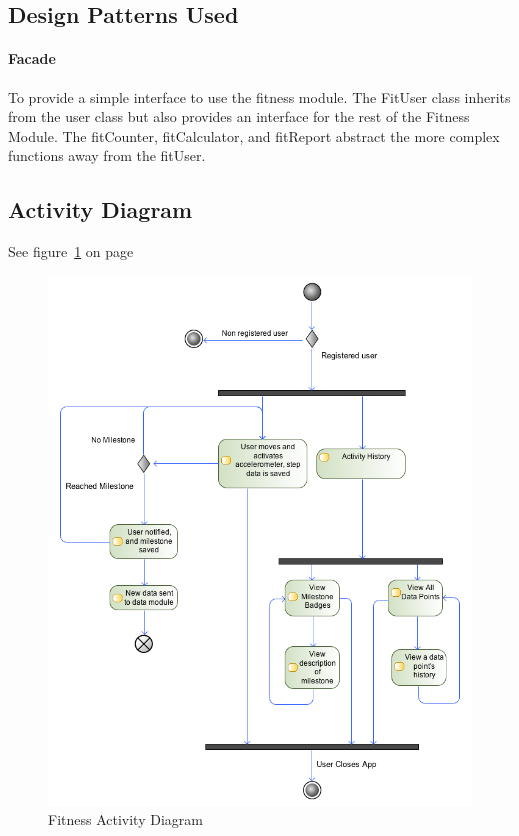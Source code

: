 \subsection{Design Patterns Used}
\paragraph{Facade}
To provide a simple interface to use the fitness module. The FitUser class inherits from the user class but also provides an interface for the rest of the Fitness Module. The fitCounter, fitCalculator, and fitReport abstract the more complex functions away from the fitUser.

\subsection{Activity Diagram}
See figure~\ref{fig:fitness_activity_diagram} on page~\pageref{fig:fitness_activity_diagram}
\begin{figure}
	\centering
	\includegraphics[scale=0.54]{Fitness/fitness_activity_diagram.png}
	\caption{Fitness Activity Diagram}
	\label{fig:fitness_activity_diagram}
\end{figure}

